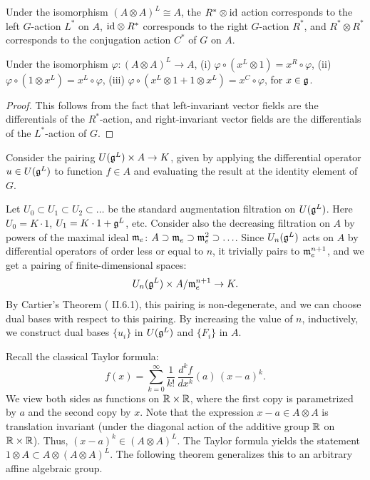 \documentclass[12pt]{amsart}
\begin{document}
\begin{lemma}
Under the isomorphism $(A \otimes A)^L \cong A$, the $R^* \otimes \textup{id}$ action corresponds to the left $G$-action $L^*$ on $A$, $\textup{id} \otimes R^*$ corresponds to the right $G$-action $R^*$, and $R^* \otimes R^*$ corresponds to the conjugation action $C^*$ of $G$ on $A$. 
\end{lemma} 
\begin{corollary}
\label{transfer}
Under the isomorphism $\varphi: (A \otimes A)^L \rightarrow A$,
 (i) $\varphi \circ (x^L \otimes 1) = x^R \circ \varphi$, 
(ii) $\varphi \circ (1 \otimes x^L) = x^L \circ \varphi$, 
(iii) $\varphi \circ (x^L \otimes 1 + 1 \otimes x^L) = x^C \circ \varphi$,
for $x \in \mathfrak{g}$.  
\end{corollary}
\begin{proof}
This follows from the fact that left-invariant vector fields are the differentials of the $R^*$-action, and right-invariant vector fields are the differentials of the $L^*$-action of $G$.
\end{proof}

Consider the pairing $U(\mathfrak{g}^L) \times A \rightarrow K$, given by applying the differential operator $u \in U(\mathfrak{g}^L)$ to function $f \in A$ and evaluating the result at the identity element of $G$.

Let $U_0 \subset U_1 \subset U_2 \subset \ldots$ be  the standard augmentation filtration on $U(\mathfrak{g}^L)$. Here $U_0 = K \cdot 1$, $U_1 = K \cdot 1 + \mathfrak{g}^L$, etc.
Consider also the decreasing filtration on $A$ by powers of the maximal ideal $\mathfrak{m}_e$:
$A \supset \mathfrak{m}_e \supset \mathfrak{m}_e^2 \supset \ldots$. Since $U_n (\mathfrak{g}^L)$ acts on $A$ by differential operators of order less or equal to $n$, it trivially pairs to $\mathfrak{m}_e^{n+1}$, and we get a pairing of finite-dimensional spaces:
$$U_n(\mathfrak{g}^L) \times A/\mathfrak{m}_e^{n+1} \rightarrow K.$$
By Cartier's Theorem (\cite{DG} II.6.1), this pairing is non-degenerate, and we can choose dual bases with respect to this pairing. By increasing the value of $n$, inductively, we construct dual bases $\{ u_i \}$ in $U(\mathfrak{g}^L)$ and $\{ F_i \}$ in $A$. 

Recall the classical Taylor formula:
$$f(x) = \sum_{k=0}^\infty \frac{1}{k!} \,\frac{d^k f}{d x^k} (a) \,(x-a)^k.$$
We view both sides as functions on ${\mathbb R} \times {\mathbb R}$, where the first copy is parametrized by $a$ and the second copy by $x$. Note that the expression $x-a \in A \otimes A$ is translation invariant (under the diagonal action of the additive group ${\mathbb R}$ on ${\mathbb R} \times {\mathbb R}$). Thus, $(x-a)^k \in (A \otimes A)^L$. The Taylor formula yields the statement $1 \otimes A \subset A \widehat\otimes (A \otimes A)^L$. The following theorem generalizes this to an arbitrary affine algebraic group. 
\end{document}
